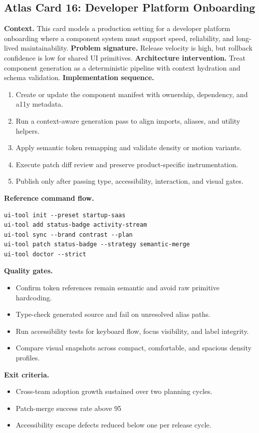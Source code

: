 \subsection*{Atlas Card 16: Developer Platform Onboarding}
\textbf{Context.} This card models a production setting for a developer platform onboarding where a component system must support speed, reliability, and long-lived maintainability.
\textbf{Problem signature.} Release velocity is high, but rollback confidence is low for shared UI primitives.
\textbf{Architecture intervention.} Treat component generation as a deterministic pipeline with context hydration and schema validation.
\textbf{Implementation sequence.}
\begin{enumerate}[leftmargin=*, itemsep=0.28em]
  \item Create or update the component manifest with ownership, dependency, and a11y metadata.
  \item Run a context-aware generation pass to align imports, aliases, and utility helpers.
  \item Apply semantic token remapping and validate density or motion variants.
  \item Execute patch diff review and preserve product-specific instrumentation.
  \item Publish only after passing type, accessibility, interaction, and visual gates.
\end{enumerate}
\textbf{Reference command flow.}
\begin{verbatim}
ui-tool init --preset startup-saas
ui-tool add status-badge activity-stream
ui-tool sync --brand contrast --plan
ui-tool patch status-badge --strategy semantic-merge
ui-tool doctor --strict
\end{verbatim}
\textbf{Quality gates.}
\begin{itemize}[leftmargin=*, itemsep=0.24em]
  \item Confirm token references remain semantic and avoid raw primitive hardcoding.
  \item Type-check generated source and fail on unresolved alias paths.
  \item Run accessibility tests for keyboard flow, focus visibility, and label integrity.
  \item Compare visual snapshots across compact, comfortable, and spacious density profiles.
\end{itemize}
\textbf{Exit criteria.}
\begin{itemize}[leftmargin=*, itemsep=0.24em]
  \item Cross-team adoption growth sustained over two planning cycles.
  \item Patch-merge success rate above 95%
  \item Accessibility escape defects reduced below one per release cycle.
\end{itemize}
\clearpage

